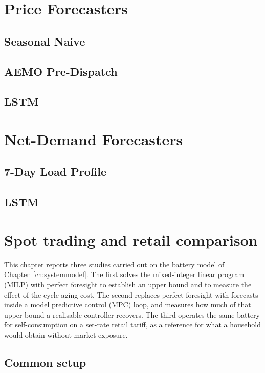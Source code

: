\section{Price Forecasters}

\subsection{Seasonal Naive}

\subsection{AEMO Pre-Dispatch}

\subsection{LSTM}


\section{Net-Demand Forecasters}
\subsection{7-Day Load Profile}

\subsection{LSTM}

\section{Spot trading and retail comparison}
\label{sec:results:trading}

This chapter reports three studies carried out on the battery model of
Chapter~\ref{ch:systemmodel}.
The first solves the mixed-integer linear program (MILP) with perfect foresight to
establish an upper bound and to measure the effect of the cycle-aging cost. The second
replaces perfect foresight with forecasts inside a model predictive control (MPC) loop,
and measures how much of that upper bound a realisable controller recovers. The third
operates the same battery for self-consumption on a set-rate retail tariff, as a
reference for what a household would obtain without market exposure.

\subsection{Common setup}
\label{sec:results:setup}

